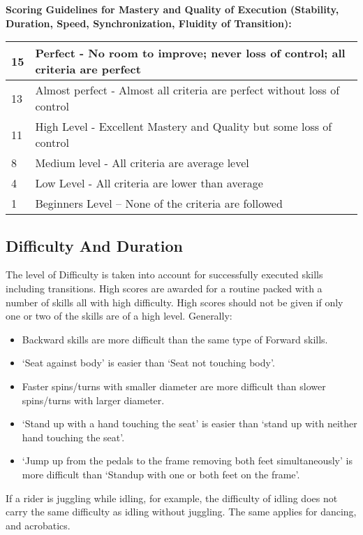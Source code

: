 \begin{minipage}{\textwidth}
\textbf{Scoring Guidelines for Mastery and Quality of Execution (Stability, Duration, Speed, Synchronization, Fluidity of Transition):} \\

\begin{tabular}{|l|p{12.5cm}|}
\hline
15 & Perfect - No room to improve; never loss of control; all criteria are perfect \\
\hline
13 & Almost perfect - Almost all criteria are perfect without loss of control \\
\hline
11 & High Level - Excellent Mastery and Quality but some loss of control \\
\hline
8 &  Medium level - All criteria are average level \\
\hline
4 & Low Level - All criteria are lower than average \\
\hline
1 & Beginners Level – None of the criteria are followed \\
\hline
\end{tabular}
\end{minipage}

\subsection{Difficulty And Duration}
The level of Difficulty is taken into account for successfully executed skills including transitions.
High scores are awarded for a routine packed with a number of skills all with high difficulty.
High scores should not be given if only one or two of the skills are of a high level.
Generally:
\begin{itemize} 
\item Backward skills are more difficult than the same type of Forward skills.
\item `Seat against body' is easier than `Seat not touching body'.
\item Faster spins/turns with smaller diameter are more difficult than slower spins/turns with larger diameter.
\item `Stand up with a hand touching the seat' is easier than `stand up with neither hand touching the seat'.
\item `Jump up from the pedals to the frame removing both feet simultaneously' is more difficult than `Standup with one or both feet on the frame'.
\end{itemize}
If a rider is juggling while idling, for example, the difficulty of idling does not carry the same difficulty as idling without juggling.
The same applies for dancing, and acrobatics.

